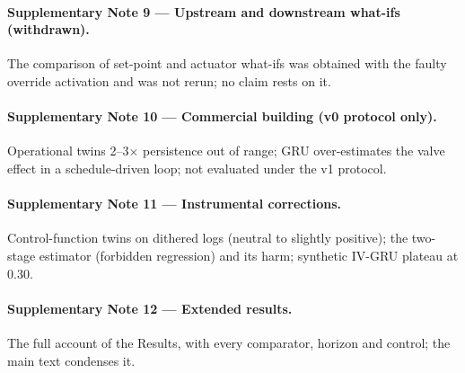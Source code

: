 \documentclass[11pt]{article}
\begin{document}
\paragraph{Supplementary Note 9 --- Upstream and downstream what-ifs (withdrawn).} The comparison of set-point and actuator what-ifs was obtained with the faulty override activation and was not rerun; no claim rests on it.

\paragraph{Supplementary Note 10 --- Commercial building (v0 protocol only).} Operational twins 2--3$\times$ persistence out of range; GRU over-estimates the valve effect in a schedule-driven loop; not evaluated under the v1 protocol.


\paragraph{Supplementary Note 11 --- Instrumental corrections.} Control-function twins on dithered logs (neutral to slightly positive); the two-stage estimator (forbidden regression) and its harm; synthetic IV-GRU plateau at 0.30.


\paragraph{Supplementary Note 12 --- Extended results.} The full account of the Results, with every comparator, horizon and control; the main text condenses it.
\end{document}
